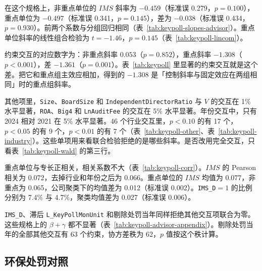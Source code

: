 \documentclass[11pt]{article}
\begin{document}
在这个规格上，非重点单位的 \(IMS\) 斜率为 \(-0.459\)（标准误 0.279，\(p=0.100\)），重点单位为 \(-0.497\)（标准误 0.341，\(p=0.145\)），差为 \(-0.038\)（标准误 0.434，\(p=0.930\)）。前两个系数与分组回归相同（表~\ref{tab:keypoll-slopes-advisor}）。重点单位斜率的线性组合检验为 \(t=-1.46\)，\(p=0.145\)（表~\ref{tab:keypoll-lincom}）。

约束交互的对应数字为：非重点斜率 \(0.053\)（\(p=0.852\)），重点斜率 \(-1.308\)（\(p<0.001\)），差 \(-1.361\)（\(p=0.001\)）。表~\ref{tab:keypoll} 里显著的约束交互就是这个差。把它和重点组主效应相加，得到的 \(-1.308\) 是「控制斜率与固定效应在两组相同」时的重点组斜率。

其他项里，\texttt{Size}、\texttt{BoardSize} 和 \texttt{IndependentDirectorRatio} 与 \(V\) 的交互在 1\% 水平显著，\texttt{ROA}、\texttt{Big4} 和 \texttt{LnAuditFee} 的交互在 5\% 水平显著。年份交互中，只有 2024 相对 2021 在 5\% 水平显著。46 个行业交互里，\(p<0.10\) 的有 17 个，\(p<0.05\) 的有 9 个，\(p<0.01\) 的有 7 个（表~\ref{tab:keypoll-other}、表~\ref{tab:keypoll-industry}）。这些单项用来看联合检验拒绝的是哪些斜率。是否改用完全交互，只看表~\ref{tab:keypoll-wald} 的第三行。


重点单位与专长正相关，相关系数不大（表~\ref{tab:keypoll-corr}）。\(IMS\) 的 Pearson 相关为 0.072，去掉行业和年份之后为 0.066。重点单位的 \(IMS\) 均值为 0.077，非重点为 0.065，公司聚类下的均值差为 0.012（标准误 0.002）。\texttt{IMS\_D}\(=1\) 的比例分别为 7.4\% 与 4.7\%，聚类均值差为 0.027（标准误 0.006）。

\texttt{IMS\_D}、滞后 \texttt{L\_KeyPollMonUnit} 和剔除处罚当年同样拒绝其他交互项联合为零。这些规格上的 \(\beta+\gamma\) 都不显著（表~\ref{tab:keypoll-advisor-appendix}）。剔除处罚当年的全部其他交互有 63 个约束，协方差秩为 62，\(p\) 值按这个秩计算。



\subsection{环保处罚对照}
\end{document}

